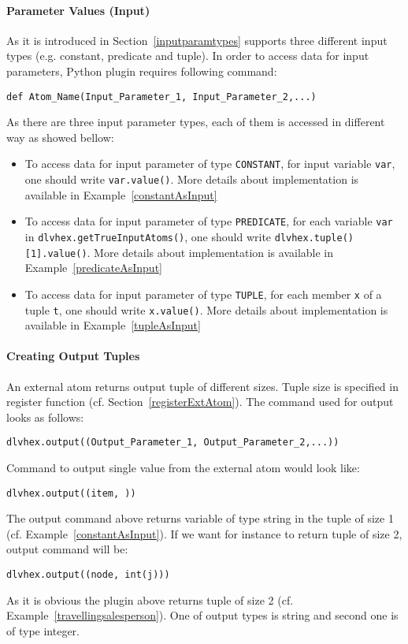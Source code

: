 \documentclass[a4paper, titlepage]{article}
\begin{document}
\paragraph{Parameter Values (Input)} As it is introduced in Section~\ref{inputparamtypes} \dlvhex{} supports three different input types (e.g. constant, predicate and tuple). In order to access data for input parameters, Python plugin requires following command:  
\begin{verbatim}
def Atom_Name(Input_Parameter_1, Input_Parameter_2,...)
\end{verbatim}
As there are three input parameter types, each of them is accessed in different way as showed bellow: 
\begin{itemize}
\item To access data for input parameter of type \verb+CONSTANT+, for input variable \verb+var+, one should write \verb+var.value()+. More details about implementation is available in Example~\ref{constantAsInput}
 
\item To access data for input parameter of type \verb+PREDICATE+, for each variable \verb+var+ in \verb+dlvhex.getTrueInputAtoms()+, one should write \verb+dlvhex.tuple()[1].value()+. More details about implementation is available in Example~\ref{predicateAsInput}  

\item To access data for input parameter of type \verb+TUPLE+, for each member \verb+x+ of a tuple \verb+t+, one should write \verb+x.value()+. More details about implementation is available in Example~\ref{tupleAsInput}
\end{itemize}

\paragraph{Creating Output Tuples}
An external atom returns output tuple of different sizes. Tuple size is specified in register function (cf. Section~\ref{registerExtAtom}). The \dlvhex{} command used for output looks as follows: 
\begin{verbatim}
dlvhex.output((Output_Parameter_1, Output_Parameter_2,...))
\end{verbatim}
Command to output single value from the external atom would look like: 
\begin{verbatim}
dlvhex.output((item, ))
\end{verbatim}
The output command above returns variable of type string in the tuple of size 1 (cf. Example~\ref{constantAsInput}). 
If we want for instance to return tuple of size 2, output command will be:
\begin{verbatim}
dlvhex.output((node, int(j)))
\end{verbatim}
As it is obvious the plugin above returns tuple of size 2 (cf. Example~\ref{travellingsalesperson}). One of output types is string and second one is of type integer. 
\end{document}
